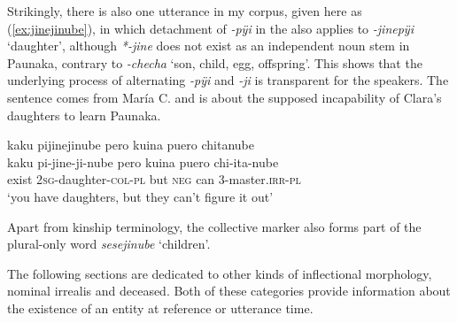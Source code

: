 Strikingly, there is also one utterance in my corpus, given here as (\ref{ex:jinejinube}), in which detachment of \textit{-pÿi} in the  also applies to \textit{-jinepÿi} ‘daughter’, although \textit{*-jine} does not exist as an independent noun stem in Paunaka, contrary to \textit{-checha} ‘son, child, egg, offspring’. This shows that the underlying process of alternating \textit{-pÿi} and \textit{-ji} is transparent for the speakers. The sentence comes from María C. and is about the supposed incapability of Clara’s daughters to learn Paunaka.

\ea\label{ex:jinejinube}
\begingl 
\glpreamble kaku pijinejinube pero kuina puero chitanube\\
\gla kaku pi-jine-ji-nube pero kuina puero chi-ita-nube\\ 
\glb exist 2\textsc{sg}-daughter-\textsc{col}-\textsc{pl} but \textsc{neg} can 3-master.\textsc{irr}-\textsc{pl}\\ 
\glft ‘you have daughters, but they can’t figure it out’\\ 
\endgl
\trailingcitation{[cux-c120414ls-2.265]}
\xe

Apart from kinship terminology, the collective marker also forms part of the plural-only word \textit{sesejinube} ‘children’.

The following sections are dedicated to other kinds of inflectional morphology, nominal irrealis and deceased. Both of these categories provide information about the existence of an entity at reference or utterance time.


